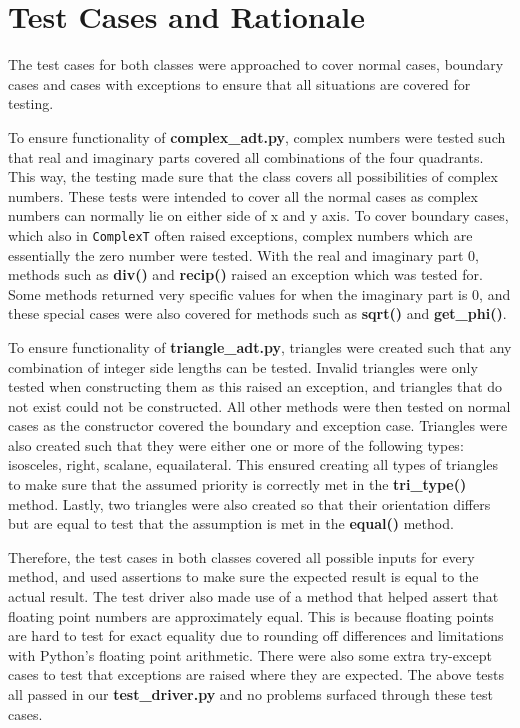 \documentclass[12pt]{article}
\begin{document}
\section{Test Cases and Rationale} \label{Testing}
\noindent The test cases for both classes were approached to cover normal cases, boundary cases and cases with exceptions to ensure that all situations are covered for testing.
\par To ensure functionality of \textbf{complex\_adt.py}, complex numbers were tested such that real and imaginary parts covered all combinations of the four quadrants. This way, the testing made sure that the class covers all possibilities of complex numbers. These tests were intended to cover all the normal cases as complex numbers can normally lie on either side of x and y axis. To cover boundary cases, which also in \verb|ComplexT| often raised exceptions, complex numbers which are essentially the zero number were tested. With the real and imaginary part 0, methods such as \textbf{div()} and \textbf{recip()} raised an exception which was tested for. Some methods returned very specific values for when the imaginary part is 0, and these special cases were also covered for methods such as \textbf{sqrt()} and \textbf{get\_phi()}.
\par To ensure functionality of \textbf{triangle\_adt.py}, triangles were created such that any combination of integer side lengths can be tested. Invalid triangles were only tested when constructing them as this raised an exception, and triangles that do not exist could not be constructed. All other methods were then tested on normal cases as the constructor covered the boundary and exception case. Triangles were also created such that they were either one or more of the following types: isosceles, right, scalane, equailateral. This ensured creating all types of triangles to make sure that the assumed priority is correctly met in the \textbf{tri\_type()} method. Lastly, two triangles were also created so that their orientation differs but are equal to test that the assumption is met in the \textbf{equal()} method.
\par Therefore, the test cases in both classes covered all possible inputs for every method, and used assertions to make sure the expected result is equal to the actual result. The test driver also made use of a method that helped assert that floating point numbers are approximately equal. This is because floating points are hard to test for exact equality due to rounding off differences and limitations with Python's floating point arithmetic. There were also some extra try-except cases to test that exceptions are raised where they are expected. The above tests all passed in our \textbf{test\_driver.py} and no problems surfaced through these test cases.
\end{document}

